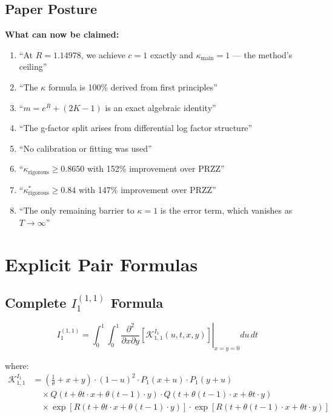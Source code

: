 \documentclass[11pt]{article}
\begin{document}
\subsection{Paper Posture}

\textbf{What can now be claimed:}
\begin{enumerate}
\item ``At $R = 1.14978$, we achieve $c = 1$ exactly and $\kappa_{\text{main}} = 1$ --- the method's ceiling''
\item ``The $\kappa$ formula is 100\% derived from first principles''
\item ``$m = e^R + (2K-1)$ is an exact algebraic identity''
\item ``The g-factor split arises from differential log factor structure''
\item ``No calibration or fitting was used''
\item ``$\kappa_{\text{rigorous}} \geq 0.8650$ with 152\% improvement over PRZZ''
\item ``$\kappa^*_{\text{rigorous}} \geq 0.84$ with 147\% improvement over PRZZ''
\item ``The only remaining barrier to $\kappa = 1$ is the error term, which vanishes as $T \to \infty$''
\end{enumerate}

\appendix

\section{Explicit Pair Formulas}
\label{app:pairs}

\subsection{Complete $I_1^{(1,1)}$ Formula}

\begin{equation}
I_1^{(1,1)} = \int_0^1 \int_0^1 \left.\frac{\partial^2}{\partial x \partial y}\left[\mathcal{K}^{I_1}_{1,1}(u,t,x,y)\right]\right|_{x=y=0} du\, dt
\end{equation}

where:
\begin{align}
\mathcal{K}^{I_1}_{1,1} &= \left(\frac{1}{\theta} + x + y\right) \cdot (1-u)^2 \cdot P_1(x+u) \cdot P_1(y+u) \\
&\quad \times Q(t + \theta t \cdot x + \theta(t-1) \cdot y) \cdot Q(t + \theta(t-1) \cdot x + \theta t \cdot y) \\
&\quad \times \exp\left[R(t + \theta t \cdot x + \theta(t-1) \cdot y)\right] \cdot \exp\left[R(t + \theta(t-1) \cdot x + \theta t \cdot y)\right]
\end{align}
\end{document}
